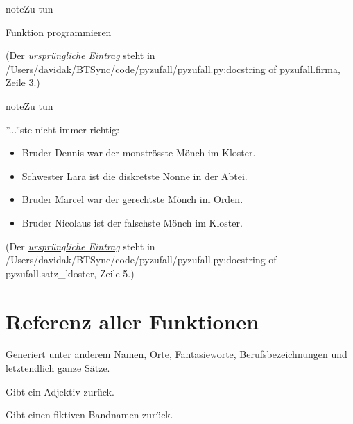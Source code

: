 \documentclass[a4paper,12pt,oneside]{sphinxmanual}
\begin{document}
\begin{notice}{note}{Zu tun}

Funktion programmieren
\end{notice}

(Der {\hyperref[funktionen:index-0]{\emph{ursprüngliche Eintrag}}} steht in /Users/davidak/BTSync/code/pyzufall/pyzufall.py:docstring of pyzufall.firma, Zeile 3.)

\begin{notice}{note}{Zu tun}

''...''ste nicht immer richtig:
\begin{itemize}
\item {} 
Bruder Dennis war der monströsste Mönch im Kloster.

\item {} 
Schwester Lara ist die diskretste Nonne in der Abtei.

\item {} 
Bruder Marcel war der gerechtste Mönch im Orden.

\item {} 
Bruder Nicolaus ist der falschste Mönch im Kloster.

\end{itemize}
\end{notice}

(Der {\hyperref[funktionen:index-1]{\emph{ursprüngliche Eintrag}}} steht in /Users/davidak/BTSync/code/pyzufall/pyzufall.py:docstring of pyzufall.satz\_kloster, Zeile 5.)


\chapter{Referenz aller Funktionen}
\label{funktionen:referenz-aller-funktionen}\label{funktionen::doc}\label{funktionen:module-pyzufall}
Generiert unter anderem Namen, Orte, Fantasieworte, Berufsbezeichnungen und letztendlich ganze Sätze.

\begin{fulllineitems}
\label{funktionen:pyzufall.adjektiv}
Gibt ein Adjektiv zurück.

\end{fulllineitems}


\begin{fulllineitems}
\label{funktionen:pyzufall.band}
Gibt einen fiktiven Bandnamen zurück.

\end{fulllineitems}
\end{document}
